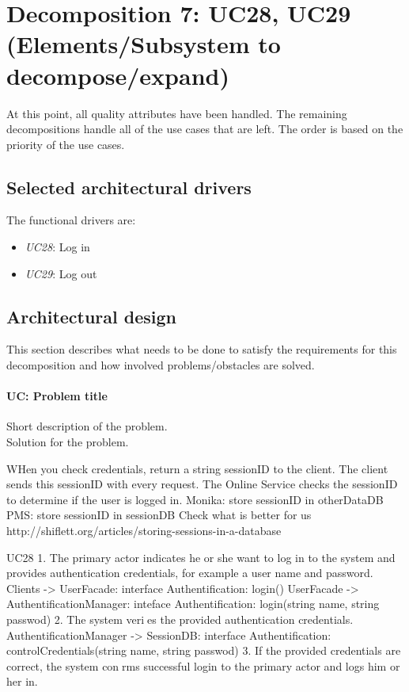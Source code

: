 \section{Decomposition 7: UC28, UC29 (Elements/Subsystem to decompose/expand)}
    At this point, all quality attributes have been handled. The remaining
    decompositions handle all of the use cases that are left. The order
    is based on the priority of the use cases.


\subsection{Selected architectural drivers}
    The functional drivers are:
    \begin{itemize}
        \item \emph{UC28}: Log in \\
        \item \emph{UC29}: Log out \\
    \end{itemize}


\subsection{Architectural design}
    This section describes what needs to be done to satisfy the requirements for
    this decomposition and how involved problems/obstacles are solved.

    \paragraph{UC: Problem title}
        Short description of the problem.\\
        Solution for the problem.

        WHen you check credentials, return a string sessionID to the client.
        The client sends this sessionID with every request.
        The Online Service checks the sessionID to determine if the user is logged in.
        Monika: store sessionID in otherDataDB
        PMS: store sessionID in sessionDB
        Check what is better for us
        http://shiflett.org/articles/storing-sessions-in-a-database
        
        UC28 
        1. The primary actor indicates he or she want to log in to the system and provides authentication
            credentials, for example a user name and password.
            Clients -> UserFacade: interface Authentification:
                            login()
            UserFacade -> AuthentificationManager: inteface  Authentification:
                            login(string name, string passwod)               
        2. The system veries the provided authentication credentials.
            AuthentificationManager -> SessionDB: interface Authentification:
                                    controlCredentials(string name, string passwod)
        3. If the provided credentials are correct, the system conrms successful login to the primary
            actor and logs him or her in.
            
